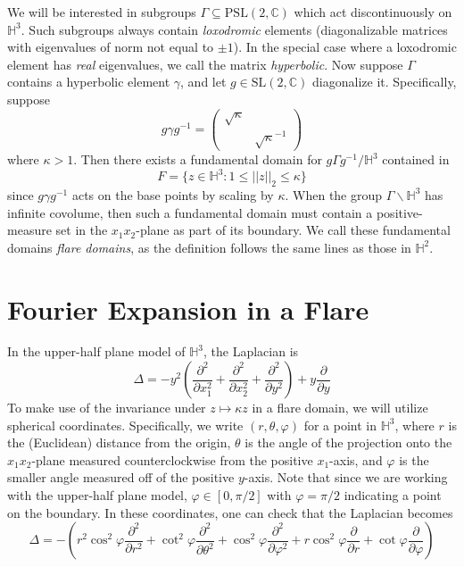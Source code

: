 \documentclass[]{article}
\begin{document}
We will be interested in subgroups $\Gamma \subseteq \text{PSL}(2, \mathbb{C})$ which act discontinuously on $\mathbb{H}^3$.
Such subgroups always contain \textit{loxodromic} elements (diagonalizable matrices with eigenvalues of norm not equal to $\pm1$).
In the special case where a loxodromic element has \textit{real} eigenvalues, we call the matrix \textit{hyperbolic}.
Now suppose $\Gamma$ contains a hyperbolic element $\gamma$, and let $g \in \text{SL}(2, \mathbb{C})$ diagonalize it.
Specifically, suppose
$$
g\gamma g^{-1} =
\begin{pmatrix}
\sqrt{\kappa} & ~ \\
~ & \sqrt{\kappa}^{-1}
\end{pmatrix}
$$
where $\kappa > 1$. Then there exists a fundamental domain for $g\Gamma g^{-1}/\mathbb{H}^3$ contained in
$$
F = \{ z \in \mathbb{H}^3 : 1 \leq ||z||_2 \leq \kappa \}
$$
since $g\gamma g^{-1}$ acts on the base points by scaling by $\kappa$.
When the group $\Gamma\backslash\mathbb{H}^3$ has infinite covolume, then such a fundamental domain must contain a positive-measure set in the $x_1x_2$-plane as part of its boundary.
We call these fundamental domains \textit{flare domains}, as the definition follows the same lines as those in $\mathbb{H}^2$.

\section*{Fourier Expansion in a Flare}

In the upper-half plane model of $\mathbb{H}^3$, the Laplacian is
$$
\Delta = -y^2\left( \frac{\partial^2}{\partial x_1^2} + \frac{\partial^2}{\partial x_2^2} + \frac{\partial^2}{\partial y^2} \right) + y\frac{\partial}{\partial y}
$$
To make use of the invariance under $z \mapsto \kappa z$ in a flare domain, we will utilize spherical coordinates.
Specifically, we write $(r, \theta, \varphi)$ for a point in $\mathbb{H}^3$, where $r$ is the (Euclidean) distance from the origin, $\theta$ is the angle of the projection onto the $x_1x_2$-plane measured counterclockwise from the positive $x_1$-axis, and $\varphi$ is the smaller angle measured off of the positive $y$-axis.
Note that since we are working with the upper-half plane model, $\varphi \in [0, \pi/2]$ with $\varphi = \pi/2$ indicating a point on the boundary.
In these coordinates, one can check that the Laplacian becomes
$$
\Delta = -\left(r^2\cos^2\varphi\frac{\partial^2}{\partial r^2} + \cot^2\varphi\frac{\partial^2}{\partial \theta^2} + \cos^2\varphi\frac{\partial^2}{\partial \varphi^2} + r\cos^2\varphi\frac{\partial}{\partial r} + \cot\varphi\frac{\partial}{\partial \varphi}\right)
$$
\end{document}
